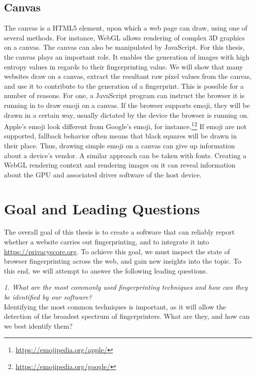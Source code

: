 \documentclass[
    fontsize=12pt,
    headings=small,
    parskip=half,
    bibliography=totoc,
    numbers=noenddot,
    open=any
    ]{scrreprt}
\begin{document}
\subsection{Canvas}
\label{fundamentals:canvas}
The canvas \cite{w3ccanvas} is a HTML5 element, upon which a web page can draw,
using one of several methods. For instance, WebGL allows rendering of complex
3D graphics on a canvas.
The canvas can also be manipulated by JavaScript. For this thesis,
the canvas plays an important role. It enables the generation
of images with high entropy values in regards to their fingerprinting value.
We will show that many websites draw on a canvas, extract the resultant raw pixel
values from the canvas, and use it to contribute to the generation of a fingerprint.
This is possible for a number of reasons. For one, a JavaScript program
can instruct the browser it is running in to draw emoji on a canvas.
If the browser supports emoji, they will be drawn in a certain way, usually dictated
by the device the browser is running on. Apple's emoji look different from Google's
emoji, for instance.\footnote{\url{https://emojipedia.org/apple/}}\footnote{\url{https://emojipedia.org/google/}}
If emoji are not supported, fallback behavior often means that black squares will
be drawn in their place.
Thus, drawing simple emoji on a canvas can give up information about a device's vendor.
A similar approach can be taken with fonts.
Creating a WebGL rendering context and rendering images on it can reveal
information about the GPU and associated driver software of the host device.


\section{Goal and Leading Questions}
\label{sec:goal}
The overall goal of this thesis is to create a software that can reliably report whether a website carries out
fingerprinting, and to integrate it into \url{https://privacyscore.org}. To achieve this goal,
we must inspect the state of browser fingerprinting across the web, and gain new insights into the topic.
To this end, we will attempt to answer the following leading questions.

\textit{1. What are the most commonly used fingerprinting techniques and how can they be identified by our software?}\\
Identifying the most common techniques is important, as it will allow the detection of the broadest spectrum
of fingerprinters. What are they, and how can we best identify them?
\end{document}
